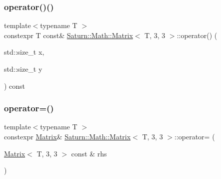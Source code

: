 \subsubsection{\texorpdfstring{operator()()}{operator()()}\hspace{0.1cm}{\footnotesize\ttfamily [2/2]}}
{\footnotesize\ttfamily template$<$typename T $>$ \\
constexpr T const\& \mbox{\hyperlink{class_saturn_1_1_math_1_1_matrix}{Saturn\+::\+Math\+::\+Matrix}}$<$ T, 3, 3 $>$\+::operator() (\begin{DoxyParamCaption}\item[{std\+::size\+\_\+t}]{x,  }\item[{std\+::size\+\_\+t}]{y }\end{DoxyParamCaption}) const\hspace{0.3cm}{\ttfamily [inline]}}

\mbox{\label{class_saturn_1_1_math_1_1_matrix_3_01_t_00_013_00_013_01_4_adaf26db4cf954ac49578c32c2d1cab06}} 
\subsubsection{\texorpdfstring{operator=()}{operator=()}\hspace{0.1cm}{\footnotesize\ttfamily [1/2]}}
{\footnotesize\ttfamily template$<$typename T $>$ \\
constexpr \mbox{\hyperlink{class_saturn_1_1_math_1_1_matrix}{Matrix}}\& \mbox{\hyperlink{class_saturn_1_1_math_1_1_matrix}{Saturn\+::\+Math\+::\+Matrix}}$<$ T, 3, 3 $>$\+::operator= (\begin{DoxyParamCaption}\item[{\mbox{\hyperlink{class_saturn_1_1_math_1_1_matrix}{Matrix}}$<$ T, 3, 3 $>$ const \&}]{rhs }\end{DoxyParamCaption})\hspace{0.3cm}{\ttfamily [inline]}}

\mbox{\label{class_saturn_1_1_math_1_1_matrix_3_01_t_00_013_00_013_01_4_a53826aa8c2fa06279e9a9771687abc48}} 
